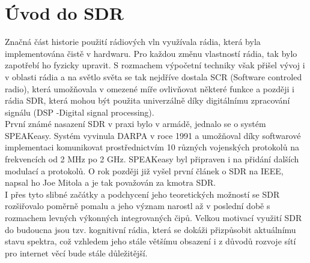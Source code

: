 \documentclass{ctuthesis}
\begin{document}
\section{Úvod do SDR} 
Značná část historie použití rádiových vln využívala rádia, která byla implementována čistě v hardwaru. Pro každou změnu vlastností rádia, tak bylo zapotřebí ho fyzicky upravit. S rozmachem výpočetní techniky však přišel vývoj i v oblasti rádia a na světlo světa se tak nejdříve dostala SCR (Software controled radio), která umožňovala v omezené míře ovlivňovat některé funkce a později i rádia SDR, která mohou být použita univerzálně díky digitálnímu zpracování signálu (DSP -Digital signal processing). \\
První známé nasazení SDR v praxi bylo v armádě, jednalo se o systém SPEAKeasy. Systém vyvinula DARPA v roce 1991 a umožňoval díky softwarové implementaci komunikovat prostřednictvím 10 různých vojenských protokolů na frekvencích od 2 MHz po 2 GHz. SPEAKeasy byl připraven i na přidání dalších modulací a protokolů. O rok později již vyšel první článek o SDR na IEEE, napsal ho Joe Mitola a je tak považován za kmotra SDR. \cite{sdrHistory2010}\\
I přes tyto slibné začátky a podchycení jeho teoretických možností se SDR rozšiřovalo poměrně pomalu a jeho význam narostl až v poslední době s rozmachem levných výkonných integrovaných čipů. Velkou motivací využití SDR do budoucna jsou tzv. kognitivní rádia, která se dokáži přizpůsobit aktuálnímu stavu spektra, což vzhledem jeho stále většímu obsazení i z důvodů rozvoje sítí pro internet věcí bude stále důležitější.
\end{document}
